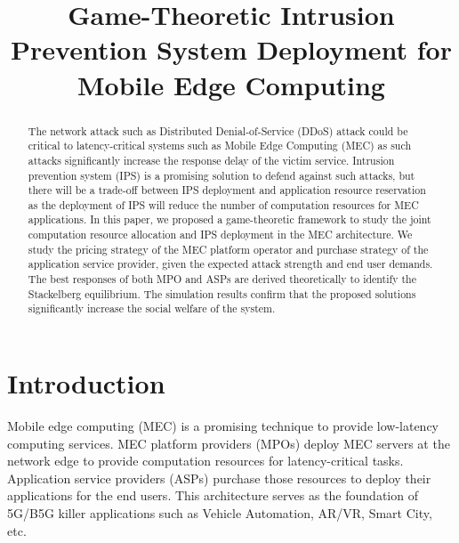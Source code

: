\documentclass[conference]{IEEEtran}
\begin{document}
\title{Game-Theoretic Intrusion Prevention System Deployment for Mobile Edge Computing}
\author{
}
\maketitle

\begin{abstract}
The network attack such as Distributed Denial-of-Service (DDoS) attack could be critical to latency-critical systems such as Mobile Edge Computing (MEC) as such attacks significantly increase the response delay of the victim service. Intrusion prevention system (IPS) is a promising solution to defend against such attacks, but there will be a trade-off between IPS deployment and application resource reservation as the deployment of IPS will reduce the number of computation resources for MEC applications. In this paper, we proposed a game-theoretic framework to study the joint computation resource allocation and IPS deployment in the MEC architecture. We study the pricing strategy of the MEC platform operator and purchase strategy of the application service provider, given the expected attack strength and end user demands. The best responses of both MPO and ASPs are derived theoretically to identify the Stackelberg equilibrium. The simulation results confirm that the proposed solutions significantly increase the social welfare of the system.
\end{abstract}

\section{Introduction}
Mobile edge computing (MEC) is a promising technique to provide low-latency computing services. MEC platform providers (MPOs) deploy MEC servers at the network edge to provide computation resources for latency-critical tasks. Application service providers (ASPs) purchase those resources to deploy their applications for the end users. This architecture serves as the foundation of 5G/B5G killer applications such as Vehicle Automation, AR/VR, Smart City, etc.
\end{document}
